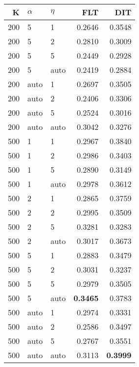 \begin{table}
\begin{spacing}{1.2}
{\begin{tabular}{rll|rr}
\bottomrule
\end{tabular}
} \hfill \parbox{.45\linewidth}{\centering \begin{tabular}{rll|rr}
\toprule
   K & $\alpha$ &   $\eta$ & FLT &       DIT \\
\midrule
 200 &     5 &     1 &           0.2646 &       0.3548 \\
 200 &     5 &     2 &           0.2810 &       0.3009 \\
 200 &     5 &     5 &           0.2449 &       0.2928 \\
 200 &     5 &  auto &           0.2419 &       0.2884 \\
 200 &  auto &     1 &           0.2697 &       0.3505 \\
 200 &  auto &     2 &           0.2406 &       0.3306 \\
 200 &  auto &     5 &           0.2524 &       0.3016 \\
 200 &  auto &  auto &           0.3042 &       0.3276 \\
 500 &     1 &     1 &           0.2967 &       0.3840 \\
 500 &     1 &     2 &           0.2986 &       0.3403 \\
 500 &     1 &     5 &           0.2890 &       0.3149 \\
 500 &     1 &  auto &           0.2978 &       0.3612 \\
 500 &     2 &     1 &           0.2865 &       0.3759 \\
 500 &     2 &     2 &           0.2995 &       0.3509 \\
 500 &     2 &     5 &           0.3281 &       0.3283 \\
 500 &     2 &  auto &           0.3017 &       0.3673 \\
 500 &     5 &     1 &           0.2883 &       0.3479 \\
 500 &     5 &     2 &           0.3031 &       0.3237 \\
 500 &     5 &     5 &           0.2979 &       0.3505 \\
 500 &     5 &  auto &     {\bf 0.3465} &       0.3783 \\
 500 &  auto &     1 &           0.2974 &       0.3331 \\
 500 &  auto &     2 &           0.2586 &       0.3497 \\
 500 &  auto &     5 &           0.2767 &       0.3551 \\
 500 &  auto &  auto &           0.3113 & {\bf 0.3999} \\
\bottomrule
\end{tabular}
}
\end{spacing}
\end{table}
